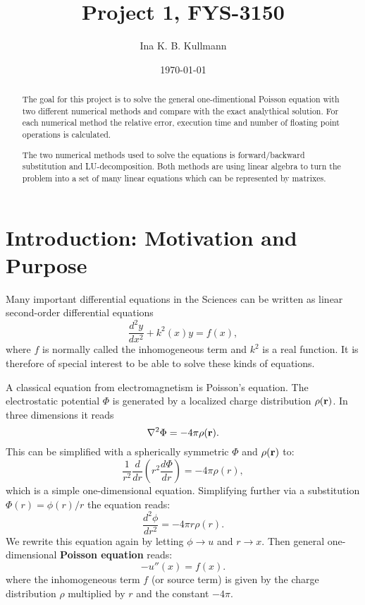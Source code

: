 \documentclass[11pt,a4wide]{article}
\title{Project 1, FYS-3150}
\author{Ina K. B. Kullmann}
\date{\today}
\begin{document}
\maketitle

\begin{abstract}
The goal for this project is to solve the general one-dimentional Poisson equation with two different numerical methods and compare with the exact analythical solution. For each numerical method the relative error, execution time and number of floating point operations is calculated.

The two numerical methods used to solve the equations is forward/backward substitution and LU-decomposition. Both methods are using linear algebra to turn the problem into a set of many linear equations which can be represented by matrixes. 


\end{abstract}

\section{Introduction: Motivation and Purpose}


Many important differential equations in the Sciences can be written as linear second-order differential equations 
\[
\frac{d^2y}{dx^2}+k^2(x)y = f(x),
\]
where $f$ is normally called the inhomogeneous term and $k^2$ is a real function. It is therefore of special interest to be able to solve these kinds of equations. 

A classical equation from electromagnetism is Poisson's equation. The electrostatic potential $\Phi$ is generated by a localized charge distribution $\rho ({\bf r})$.   In three dimensions it reads
\[
\nabla^2 \Phi = -4\pi \rho ({\bf r}).
\]
This can be simplified with a spherically symmetric $\Phi$ and $\rho ({\bf r})$ to:
\[
\frac{1}{r^2}\frac{d}{dr}\left(r^2\frac{d\Phi}{dr}\right) = -4\pi \rho(r),
\]
which is a simple one-dimensional equation. Simplifying further via a substitution $\Phi(r)= \phi(r)/r$ the equation reads:
\[
\frac{d^2\phi}{dr^2}= -4\pi r\rho(r).
\]
We rewrite this equation again by letting $\phi\rightarrow u$ and 
$r\rightarrow x$. Then general one-dimensional \textbf{Poisson equation} reads:
\begin{equation}
-u''(x) = f(x). 
\label{eq:Poisson}
\end{equation}
where the inhomogeneous term $f$ (or source term) is given by the charge distribution $\rho$  multiplied by $r$ and the constant $-4\pi$.
\end{document}
